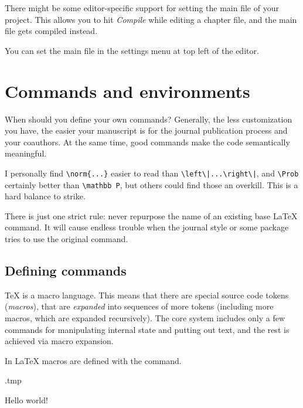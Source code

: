 There might be some editor-specific support for setting the main file of your project.
This allows you to hit \emph{Compile} while editing a chapter file,
and the main file gets compiled instead.

\begin{overleaf}
You can set the main file in the settings menu at top left of the editor.
\end{overleaf}




%
%
%
\section{Commands and environments}

\begin{practices}
When should you define your own commands?
Generally, the less customization you have,
the easier your manuscript is for the journal publication process and your coauthors.
At the same time, good commands make the code semantically meaningful.

I personally find \verb&\norm{...}& easier to read than \verb&\left\|...\right\|&,
and \verb|\Prob| certainly better than \verb|\mathbb P|,
but others could find those an overkill.
This is a hard balance to strike.

There is just one strict rule:
never repurpose the name of an existing base \LaTeX{} command.
It will cause endless trouble when the journal style or some package tries to use the original command.
\end{practices}


\subsection{Defining commands}
\TeX{} is a macro language.
This means that there are special source code tokens (\emph{macros}),
that are \emph{expanded} into sequences of more tokens
(including more macros, which are expanded recursively).
The core system includes only a few commands for manipulating internal state and putting out text,
and the rest is achieved via macro expansion.

In \LaTeX{} macros are defined with the  command.

\begin{VerbatimOut}{\jobname.tmp}
\newcommand{\hello}{Hello world!}

\hello
\end{VerbatimOut}
\ShowExample


